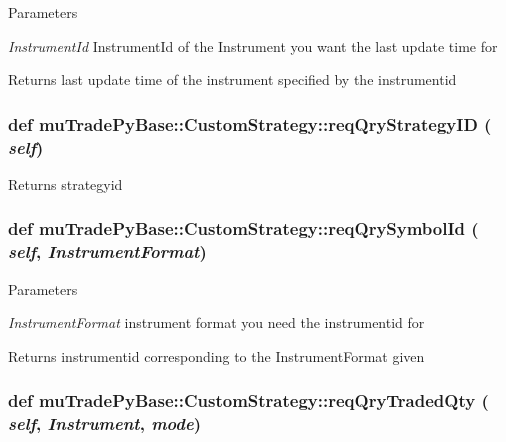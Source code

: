 \begin{DoxyParams}{Parameters}
\item[{\em InstrumentId}]InstrumentId of the Instrument you want the last update time for \end{DoxyParams}
\begin{DoxyReturn}{Returns}
last update time of the instrument specified by the instrumentid 
\end{DoxyReturn}
\hypertarget{classmuTradePyBase_1_1CustomStrategy_a17c1786aa8fe23b8edb06dd064a2ff11}{
\subsubsection[{reqQryStrategyID}]{\setlength{\rightskip}{0pt plus 5cm}def muTradePyBase::CustomStrategy::reqQryStrategyID ( {\em self})}}
\label{classmuTradePyBase_1_1CustomStrategy_a17c1786aa8fe23b8edb06dd064a2ff11}
\begin{DoxyReturn}{Returns}
strategyid 
\end{DoxyReturn}
\hypertarget{classmuTradePyBase_1_1CustomStrategy_affe1610052e184d5501345f1a3f14169}{
\subsubsection[{reqQrySymbolId}]{\setlength{\rightskip}{0pt plus 5cm}def muTradePyBase::CustomStrategy::reqQrySymbolId ( {\em self}, \/   {\em InstrumentFormat})}}
\label{classmuTradePyBase_1_1CustomStrategy_affe1610052e184d5501345f1a3f14169}

\begin{DoxyParams}{Parameters}
\item[{\em InstrumentFormat}]instrument format you need the instrumentid for \end{DoxyParams}
\begin{DoxyReturn}{Returns}
instrumentid corresponding to the InstrumentFormat given 
\end{DoxyReturn}
\hypertarget{classmuTradePyBase_1_1CustomStrategy_a4f5ff1338b2dab2bd1fc6a6262eda68b}{
\subsubsection[{reqQryTradedQty}]{\setlength{\rightskip}{0pt plus 5cm}def muTradePyBase::CustomStrategy::reqQryTradedQty ( {\em self}, \/   {\em Instrument}, \/   {\em mode})}}
\label{classmuTradePyBase_1_1CustomStrategy_a4f5ff1338b2dab2bd1fc6a6262eda68b}

